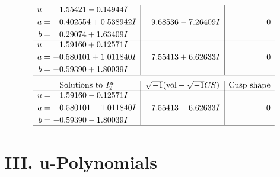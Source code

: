 \documentclass[1p]{elsarticle_modified}
\theoremstyle{definition}
\newcommand{\I}{\sqrt{-1}}
\begin{document}
$$\begin{array}{c|c|c}
\begin{aligned}
u &= \phantom{-}1.55421 - 0.14944 I \\
a &= -0.402554 + 0.538942 I \\
b &= \phantom{-}0.29074 + 1.63409 I\end{aligned}
 & \phantom{-}9.68536 - 7.26409 I & \phantom{-0.000000 } 0 \\ \hline\begin{aligned}
u &= \phantom{-}1.59160 + 0.12571 I \\
a &= -0.580101 + 1.011840 I \\
b &= -0.59390 + 1.80039 I\end{aligned}
 & \phantom{-}7.55413 + 6.62633 I & \phantom{-0.000000 } 0\\
 \hline 
 \end{array}$$\newpage$$\begin{array}{c|c|c}  
\text{Solutions to }I^u_{2}& \I (\text{vol} + \sqrt{-1}CS) & \text{Cusp shape}\\
 \hline 
\begin{aligned}
u &= \phantom{-}1.59160 - 0.12571 I \\
a &= -0.580101 - 1.011840 I \\
b &= -0.59390 - 1.80039 I\end{aligned}
 & \phantom{-}7.55413 - 6.62633 I & \phantom{-0.000000 } 0\\
 \hline 
 \end{array}$$\newpage
\newpage\renewcommand{\arraystretch}{1}
\centering \section*{ III. u-Polynomials}
\end{document}
